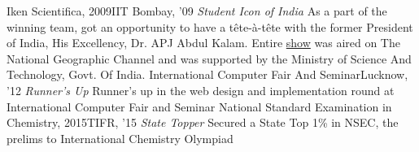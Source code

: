 \begin{talks}
    \talk
	{Iken Scientifica, 2009}{IIT Bombay, '09}
	{\textit{Student Icon of India}}
	{As a part of the winning team, got an opportunity to have a tête-à-tête with the former President of India, His Excellency, Dr. APJ Abdul Kalam. Entire \href{https://www.youtube.com/watch?v=LRPbv4j_Z_w}{show} was aired on The National Geographic Channel and was supported by the Ministry of Science And Technology, Govt. Of India.}
	\talk
	{International Computer Fair And Seminar}{Lucknow, '12}
	{\textit{Runner's Up}}
	{Runner's up in the web design and implementation round at International Computer Fair and Seminar}
	\talk
	{National Standard Examination in Chemistry, 2015}{TIFR, '15}
	{\textit{State Topper}}
	{Secured a State Top 1\% in NSEC, the prelims to International Chemistry Olympiad}
\end{talks}    
\vspace{-3mm}

